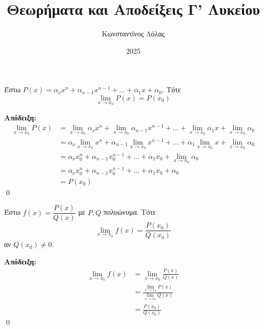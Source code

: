 \documentclass[a4paper, 12pt]{article}
\title{Θεωρήματα και Αποδείξεις Γ' Λυκείου}
\author{Κωνσταντίνος Λόλας}
\date{2025}
\renewenvironment{proof}[1][\textbf{Απόδειξη}]{%
  \par\noindent\textbf{#1:} \rmfamily}{\qed\par}
\begin{document}
\pagestyle{fancy}
\fancyhead{} %
\fancyfoot{} %

\maketitle

\begin{theorem}{}
  Έστω $P(x)=α_νx^n+α_{n-1}x^{n-1}+...+α_1x+α_0$. Τότε
  $$\lim_{x\to x_0}P(x)=P(x_0)$$
\end{theorem}
\begin{proof}
  \begin{align*}
    \lim_{x\to x_0}P(x) & =\lim_{x\to x_0}α_νx^n+\lim_{x\to x_0}α_{n-1}x^{n-1}+...+\lim_{x\to x_0}α_1x+\lim_{x\to x_0}α_0 \\
                        & =α_ν\lim_{x\to x_0}x^n+α_{n-1}\lim_{x\to x_0}x^{n-1}+...+α_1\lim_{x\to x_0}x+\lim_{x\to x_0}α_0 \\
                        & =α_νx_0^n+α_{n-1}x_0^{n-1}+...+α_1x_0+\lim_{x\to x_0}α_0                                        \\
                        & =α_νx_0^n+α_{n-1}x_0^{n-1}+...+α_1x_0+α_0                                                       \\
                        & =P(x_0)
  \end{align*}
\end{proof}

\begin{theorem}{}
  Έστω $f(x)=\dfrac{P(x)}{Q(x)}$ με $P,Q$ πολυώνυμα. Τότε
  $$\lim_{x\to x_0}f(x)=\frac{P(x_0)}{Q(x_0)}$$
  αν $Q(x_0)\neq 0$.
\end{theorem}
\begin{proof}
  \begin{align*}
    \lim_{x\to x_0}f(x) & =\lim_{x\to x_0}\frac{P(x)}{Q(x)}                \\
                        & =\frac{\lim_{x\to x_0}P(x)}{\lim_{x\to x_0}Q(x)} \\
                        & =\frac{P(x_0)}{Q(x_0)}
  \end{align*}
\end{proof}
\end{document}

